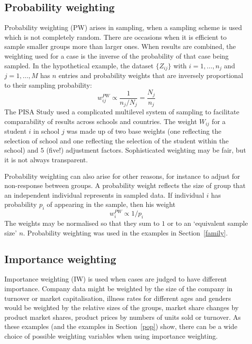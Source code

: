 \documentclass{svmult}
\begin{document}
\subsection{Probability weighting}
\label{pw}
Probability weighting (PW) arises in sampling, when a sampling scheme is used which is not completely random.   There are occasions when it is efficient to sample smaller groups more than larger ones.  When results are combined, the weighting used for a case is the inverse of the probability of that case being sampled.  In the hypothetical example, the dataset $\{Z_{ij}\}$ with $i=1,\dots,n_j$ and $ j=1,\dots,M$ has $n$ entries and probability weights that are inversely proportional to their sampling probability:
$$w_{ij}^{PW} \propto \frac{1}{n_j/N_j}=\frac{N_j}{n_j}$$
The PISA Study \citep{adams:2002}  used a complicated multilevel system of sampling to facilitate comparability of results across schools and countries.  The weight $W_{ij}$ for a student $i$ in school $j$ was made up of two base weights (one reflecting the selection of school and one reflecting the selection of the student within the school) and $5$ (five!) adjustment factors.  Sophisticated weighting may be fair, but it is not always transparent.
\par
Probability weighting can also arise for other reasons, for instance to adjust for non-response between groups.  A probability weight reflects the size of group that an independent individual represents in sampled data.  If individual $i$ has probability $p_i$ of appearing in the sample, then his weight
$$w_i^{PW} \propto 1/p_i$$
The weights may be normalised so that they sum to $1$ or to an `equivalent sample size' $n$.  Probability weighting was used in the examples in Section~\ref{family}.

\subsection{Importance weighting}
\label{iw}
Importance weighting (IW) is used when cases are judged to have different importance.  Company data might be weighted by the size of the company in turnover or market capitalisation, illness rates for different ages and genders would be weighted by the relative sizes of the groups, market share changes by product market shares, product prices by numbers of units sold or turnover.  As these examples (and the examples in Section~\ref{pop}) show, there can be a wide choice of possible weighting variables when using importance weighting.
\end{document}
